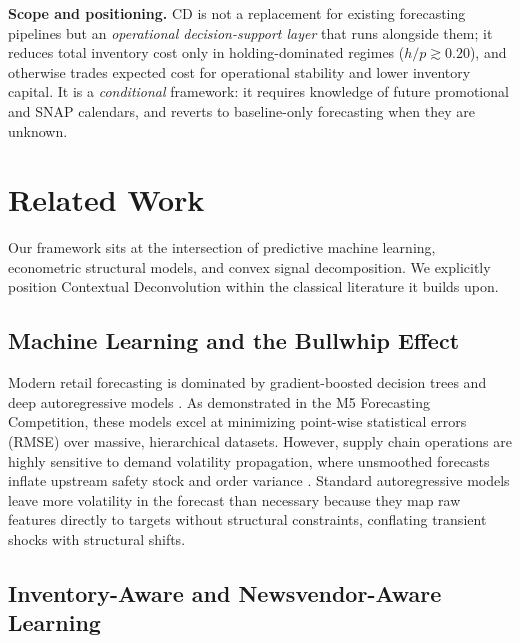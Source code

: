 \documentclass[10pt]{article} %
\theoremstyle{plain}
\theoremstyle{definition}
\begin{document}
\textbf{Scope and positioning.} CD is not a replacement for existing forecasting pipelines but an \emph{operational decision-support layer} that runs alongside them; it reduces total inventory cost only in holding-dominated regimes ($h/p \gtrsim 0.20$), and otherwise trades expected cost for operational stability and lower inventory capital. It is a \emph{conditional} framework: it requires knowledge of future promotional and SNAP calendars, and reverts to baseline-only forecasting when they are unknown.


\section{Related Work}
\label{sec:related_work}

Our framework sits at the intersection of predictive machine learning, econometric structural models, and convex signal decomposition. We explicitly position Contextual Deconvolution within the classical literature it builds upon.

\subsection{Machine Learning and the Bullwhip Effect}

Modern retail forecasting is dominated by gradient-boosted decision trees \citep{chen2016xgboost} and deep autoregressive models \citep{salinas2020deepar,wen2023transformers}. As demonstrated in the M5 Forecasting Competition, these models excel at minimizing point-wise statistical errors (RMSE) over massive, hierarchical datasets. However, supply chain operations are highly sensitive to demand volatility propagation, where unsmoothed forecasts inflate upstream safety stock and order variance \citep{lee1997bullwhip,macdonald2003supply,fransoo2000measuring}. Standard autoregressive models leave more volatility in the forecast than necessary because they map raw features directly to targets without structural constraints, conflating transient shocks with structural shifts.

\subsection{Inventory-Aware and Newsvendor-Aware Learning}
\end{document}

